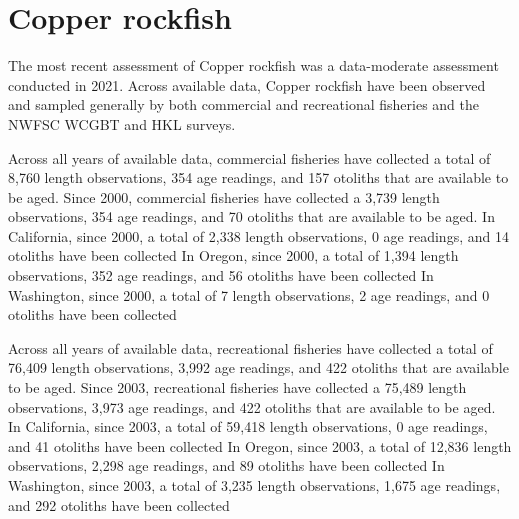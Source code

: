 \documentclass[11pt,
  english,
  letterpaper,
]{article}
\begin{document}

\hypertarget{copper-rockfish}{%
\section{Copper rockfish}\label{copper-rockfish}}

\leavevmode\tagmcend\tagstructend


The most recent assessment of Copper rockfish was a data-moderate assessment conducted in 2021. Across available data, Copper rockfish have been observed and sampled generally by both commercial and recreational fisheries and the NWFSC WCGBT and HKL surveys.

\leavevmode\tagmcend\tagstructend\par


Across all years of available data, commercial fisheries have collected a total of 8,760 length observations, 354 age readings, and 157 otoliths that are available to be aged. Since 2000, commercial fisheries have collected a 3,739 length observations, 354 age readings, and 70 otoliths that are available to be aged. In California, since 2000, a total of 2,338 length observations, 0 age readings, and 14 otoliths have been collected In Oregon, since 2000, a total of 1,394 length observations, 352 age readings, and 56 otoliths have been collected In Washington, since 2000, a total of 7 length observations, 2 age readings, and 0 otoliths have been collected

\leavevmode\tagmcend\tagstructend\par


Across all years of available data, recreational fisheries have collected a total of 76,409 length observations, 3,992 age readings, and 422 otoliths that are available to be aged. Since 2003, recreational fisheries have collected a 75,489 length observations, 3,973 age readings, and 422 otoliths that are available to be aged. In California, since 2003, a total of 59,418 length observations, 0 age readings, and 41 otoliths have been collected In Oregon, since 2003, a total of 12,836 length observations, 2,298 age readings, and 89 otoliths have been collected In Washington, since 2003, a total of 3,235 length observations, 1,675 age readings, and 292 otoliths have been collected
\end{document}
